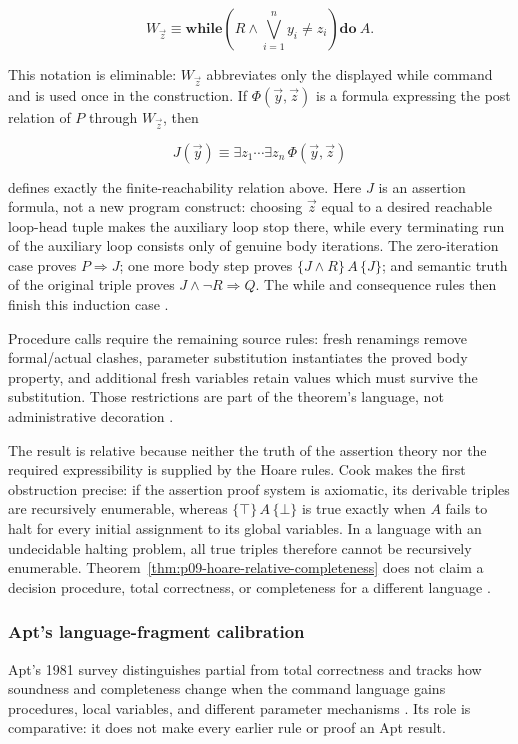 \[
 W_{\vec z}\equiv
 \mathbf{while}\!
 \left(R\land\bigvee_{i=1}^{n}y_i\neq z_i\right)
 \mathbf{do}\ A.
\]

This notation is eliminable: \(W_{\vec z}\) abbreviates only the displayed
while command and is used once in the construction.  If
\(\Phi(\vec y,\vec z)\) is a formula expressing the post relation of \(P\)
through \(W_{\vec z}\), then

\[
 J(\vec y)\equiv\exists z_1\cdots\exists z_n\,
                    \Phi(\vec y,\vec z)
\]

defines exactly the finite-reachability relation above.  Here \(J\) is an
assertion formula, not a new program construct: choosing \(\vec z\) equal to a
desired reachable loop-head tuple makes the auxiliary loop stop there, while
every terminating run of the auxiliary loop consists only of genuine body
iterations.  The zero-iteration case proves \(P\Rightarrow J\); one more body
step proves \(\{J\land R\}\,A\,\{J\}\); and semantic truth of the original
triple proves \(J\land\neg R\Rightarrow Q\).  The while and consequence rules
then finish this induction case \cite[pp.~86--87]{Cook1978}.

Procedure calls require the remaining source rules: fresh renamings remove
formal/actual clashes, parameter substitution instantiates the proved body
property, and additional fresh variables retain values which must survive the
substitution.  Those restrictions are part of the theorem's language, not
administrative decoration \cite[pp.~87--89]{Cook1978}.

The result is relative because neither the truth of the assertion theory nor
the required expressibility is supplied by the Hoare rules.  Cook makes the
first obstruction precise: if the assertion proof system is axiomatic, its
derivable triples are recursively enumerable, whereas
\(\{\top\}\,A\,\{\bot\}\) is true exactly when \(A\) fails to halt for every
initial assignment to its global variables.  In a language with an
undecidable halting problem, all true triples therefore cannot be recursively
enumerable.  Theorem~\ref{thm:p09-hoare-relative-completeness} does not claim a
decision procedure, total correctness, or completeness for a different
language \cite[pp.~85--86]{Cook1978}.

\subsubsection{Apt's language-fragment calibration}

Apt's 1981 survey distinguishes partial from total correctness and tracks how
soundness and completeness change when the command language gains procedures,
local variables, and different parameter mechanisms \cite{Apt1981}.  Its role
is comparative: it does not make every earlier rule or proof an Apt result.

